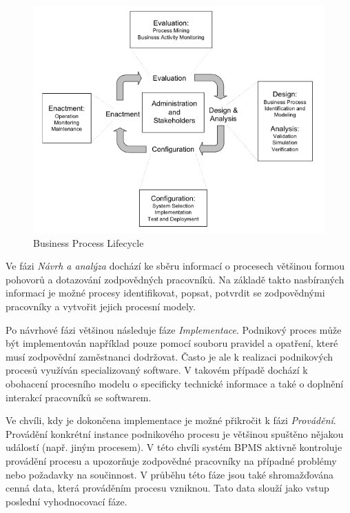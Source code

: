 \begin{figure}
\centering
\includegraphics[width=1.0\textwidth]{obrazky/processLifecycle}
\caption{Business Process Lifecycle \cite{Weske2007}}
\label{fig:BusinessProcessLifecycle}
\end{figure}

Ve fázi \textit{Návrh a analýza} dochází ke sběru informací o procesech většinou formou pohovorů a dotazování zodpovědných pracovníků. Na základě takto nasbíraných informací je možné procesy identifikovat, popsat, potvrdit se zodpovědnými pracovníky a vytvořit jejich procesní modely.

Po návrhové fázi většinou následuje fáze \textit{Implementace}. Podnikový proces může být implementován například pouze  pomocí souboru pravidel a opatření, které musí zodpovědní zaměstnanci dodržovat. Často je ale k realizaci podnikových procesů využíván specializovaný software. V takovém případě dochází k obohacení procesního modelu o specificky technické informace a také o doplnění interakcí pracovníků se softwarem.

Ve chvíli, kdy je dokončena implementace je možné přikročit k fázi \textit{Provádění}. Provádění konkrétní instance podnikového procesu je většinou spuštěno nějakou událostí (např. jiným procesem). V této chvíli systém BPMS aktivně kontroluje provádění procesu a upozorňuje zodpovědné pracovníky na případné problémy nebo požadavky na součinnost. V průběhu této fáze jsou také shromažďována cenná data, která prováděním procesu vzniknou. Tato data slouží jako vstup poslední vyhodnocovací fáze.

